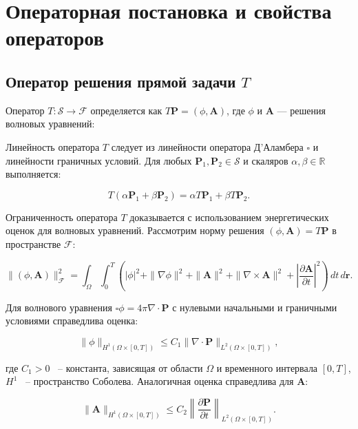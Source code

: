 \documentclass[a4paper,14pt,oneside,openany]{extarticle}
\begin{document}
\newpage
\section{Операторная постановка и свойства операторов}
\label{sec:operator_properties}

\subsection{Оператор решения прямой задачи $T$}
Оператор $T: \mathcal{S} \to \mathcal{F}$ определяется как $T\mathbf{P} = (\phi, \mathbf{A})$, 
где $\phi$ и $\mathbf{A}$ --- решения волновых уравнений:

Линейность оператора $T$ следует из линейности оператора Д’Аламбера $\square$ и линейности 
граничных условий. Для любых $\mathbf{P}_1, \mathbf{P}_2 \in \mathcal{S}$ и скаляров $\alpha, \beta \in \mathbb{R}$ выполняется:

\begin{equation}
    T(\alpha \mathbf{P}_1 + \beta \mathbf{P}_2) = \alpha T\mathbf{P}_1 + \beta T\mathbf{P}_2.
\end{equation}

Ограниченность оператора $T$ доказывается с использованием энергетических оценок для волновых уравнений. 
Рассмотрим норму решения $(\phi, \mathbf{A}) = T\mathbf{P}$ в пространстве $\mathcal{F}$:

\begin{equation}
    \|(\phi, \mathbf{A})\|_{\mathcal{F}}^2 = 
    \int_\Omega \int_0^T \left( |\phi|^2 + \|\nabla \phi\|^2 + 
    \|\mathbf{A}\|^2 + \|\nabla \times \mathbf{A}\|^2 + 
    \left|\frac{\partial \mathbf{A}}{\partial t}\right|^2 \right) \, dt \, d\mathbf{r}.
\end{equation}

Для волнового уравнения $\square \phi = 4\pi \nabla \cdot \mathbf{P}$ с нулевыми начальными и граничными условиями справедлива оценка:

\begin{equation}
    \|\phi\|_{H^1(\Omega \times [0,T])} \leq C_1 \|\nabla \cdot \mathbf{P}\|_{L^2(\Omega \times [0,T])},
\end{equation}

где $C_1 > 0$ ~-- константа, зависящая от области $\Omega$ и временного интервала 
$[0,T]$, $H^1$ ~-- пространство Соболева. Аналогичная оценка справедлива для $\mathbf{A}$:

\begin{equation}
    \|\mathbf{A}\|_{H^1(\Omega \times [0,T])} \leq C_2 \left\|\frac{\partial \mathbf{P}}{\partial t}\right\|_{L^2(\Omega \times [0,T])}.
\end{equation}
\end{document}

